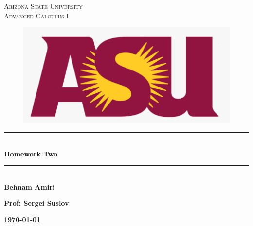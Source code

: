 \documentclass[fleqn]{article}
\begin{document}
  \begin{titlepage}

    \newcommand{\HRule}{\rule{\linewidth}{0.5mm}}

    \center


    \textsc{\LARGE Arizona State University}\\[1.5cm]

    \textsc{\LARGE Advanced Calculus I }\\[1.5cm]


    \begin{figure}
      \includegraphics[width=\linewidth]{asu.png}
    \end{figure}


    \HRule \\[0.4cm]
    { \huge \bfseries Homework Two }\\[0.4cm] 
    \HRule \\[1.5cm]

    \textbf{Behnam Amiri}

    \bigbreak

    \textbf{Prof: Sergei Suslov}

    \bigbreak


    \textbf{{\large \today}\\[2cm]}

    \vfill

  \end{titlepage}
\end{document}
